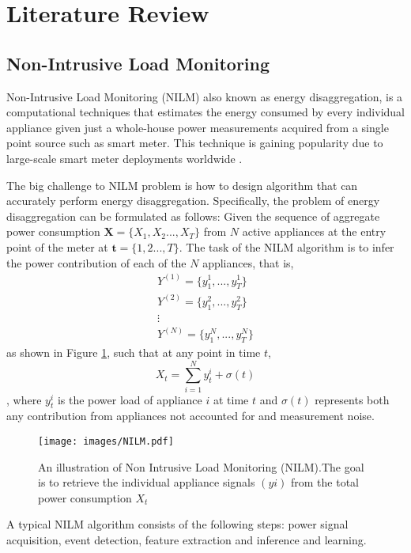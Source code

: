 \section{Literature Review}

\lipsum[2]

\subsection{Non-Intrusive Load Monitoring}

Non-Intrusive Load Monitoring (NILM) also known as energy disaggregation, is a computational techniques that estimates the energy consumed by every individual appliance given just a whole-house power measurements acquired from a single point source such as smart meter. This technique is gaining popularity due to large-scale smart meter deployments worldwide \citep{ReyesLua2015}. 

The big challenge to NILM problem is how to design  algorithm that can accurately perform energy disaggregation. Specifically, the problem of energy disaggregation can be formulated as follows: Given the sequence of aggregate power consumption $\bm{X} = \{X_1,X_2...,X_T \}$ from $N$ active appliances at the entry point of the meter at $\bm{t}=\{1, 2..., T\}$. The task of the NILM algorithm is to infer the power contribution of each of the $N$ appliances, that is,
\begin{gather*}
Y^{(1)} = \{y_1^1, ...,y_T^1\}\\
Y^{(2)} = \{y_1^2, ...,y_T^2\}\\
\vdots \\
Y^{(N)} = \{y_1^N, ..., y_T^N\}
\end{gather*} as shown in Figure \ref{fig:NILM}, such that at any point in time $t$, $$X_t = \sum_{i=1}^N y_t^i + \sigma(t)$$, where $y_t^i$ is the power load of appliance $i$ at time $t$ and $\sigma(t)$ represents both any contribution from appliances not accounted for and measurement noise.
\begin{figure}[ht]
	\centering
	\texttt{[image: images/NILM.pdf]}
	\caption[An illustration of Non Intrusive Load Monitoring (NILM)]{An illustration of Non Intrusive Load Monitoring (NILM).The goal is to retrieve the individual
		appliance signals $(yi)$ from the total power consumption $X_t$ \citep{Huss2015}}
	\label{fig:NILM}
\end{figure}

A typical NILM algorithm consists of the following steps: power signal acquisition, event detection, feature extraction and inference and learning.

